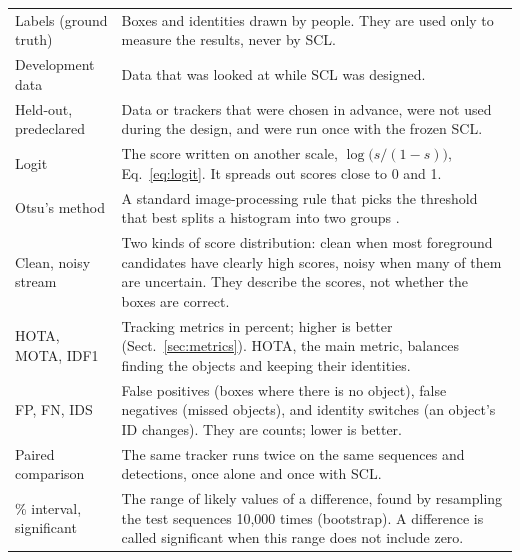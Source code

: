 \documentclass[pdflatex,sn-mathphys-num,iicol]{sn-jnl}
\newcommand{\scl}{SCL}
\begin{document}
\begin{table}[t]
\begin{tabular}{@{}>{\raggedright\arraybackslash}p{32mm}>{\raggedright\arraybackslash}p{123mm}@{}}
Labels (ground truth) & Boxes and identities drawn by people. They are used only to measure the results, never by \scl{}.\\
Development data & Data that was looked at while \scl{} was designed.\\
Held-out, predeclared & Data or trackers that were chosen in advance, were not used during the design, and were run once with the frozen \scl{}.\\
Logit & The score written on another scale, $\log\bigl(s/(1-s)\bigr)$, Eq.~\eqref{eq:logit}. It spreads out scores close to 0 and 1.\\
Otsu's method & A standard image-processing rule that picks the threshold that best splits a histogram into two groups \cite{otsu1979}.\\
Clean, noisy stream & Two kinds of score distribution: clean when most foreground candidates have clearly high scores, noisy when many of them are uncertain. They describe the scores, not whether the boxes are correct.\\
HOTA, MOTA, IDF1 & Tracking metrics in percent; higher is better (Sect.~\ref{sec:metrics}). HOTA, the main metric, balances finding the objects and keeping their identities.\\
FP, FN, IDS & False positives (boxes where there is no object), false negatives (missed objects), and identity switches (an object's ID changes). They are counts; lower is better.\\
Paired comparison & The same tracker runs twice on the same sequences and detections, once alone and once with \scl{}.\\
95\% interval, significant & The range of likely values of a difference, found by resampling the test sequences 10,000 times (bootstrap). A difference is called significant when this range does not include zero.\\
\bottomrule
\end{tabular}
\end{table}
\end{document}
